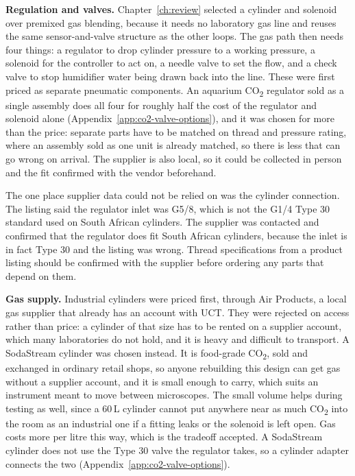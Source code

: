 \textbf{Regulation and valves.} Chapter~\ref{ch:review} selected a cylinder and solenoid over premixed gas blending, because it needs no laboratory gas line and reuses the same sensor-and-valve structure as the other loops. The gas path then needs four things: a regulator to drop cylinder pressure to a working pressure, a solenoid for the controller to act on, a needle valve to set the flow, and a check valve to stop humidifier water being drawn back into the line. These were first priced as separate pneumatic components. An aquarium CO\textsubscript{2} regulator sold as a single assembly does all four for roughly half the cost of the regulator and solenoid alone (Appendix~\ref{app:co2-valve-options}), and it was chosen for more than the price: separate parts have to be matched on thread and pressure rating, where an assembly sold as one unit is already matched, so there is less that can go wrong on arrival. The supplier is also local, so it could be collected in person and the fit confirmed with the vendor beforehand.

The one place supplier data could not be relied on was the cylinder connection. The listing said the regulator inlet was G5/8, which is not the G1/4 Type 30 standard used on South African cylinders. The supplier was contacted and confirmed that the regulator does fit South African cylinders, because the inlet is in fact Type 30 and the listing was wrong. Thread specifications from a product listing should be confirmed with the supplier before ordering any parts that depend on them.

\textbf{Gas supply.} Industrial cylinders were priced first, through Air Products, a local gas supplier that already has an account with UCT. They were rejected on access rather than price: a cylinder of that size has to be rented on a supplier account, which many laboratories do not hold, and it is heavy and difficult to transport. A SodaStream cylinder was chosen instead. It is food-grade CO\textsubscript{2}, sold and exchanged in ordinary retail shops, so anyone rebuilding this design can get gas without a supplier account, and it is small enough to carry, which suits an instrument meant to move between microscopes. The small volume helps during testing as well, since a 60\,L cylinder cannot put anywhere near as much CO\textsubscript{2} into the room as an industrial one if a fitting leaks or the solenoid is left open. Gas costs more per litre this way, which is the tradeoff accepted. A SodaStream cylinder does not use the Type 30 valve the regulator takes, so a cylinder adapter connects the two (Appendix~\ref{app:co2-valve-options}).

